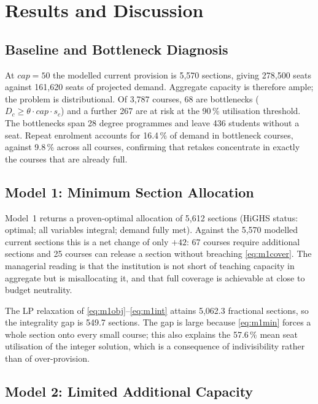 \documentclass[conference]{IEEEtran}
\begin{document}
\section{Results and Discussion}

\subsection{Baseline and Bottleneck Diagnosis}

At $cap = 50$ the modelled current provision is 5{,}570 sections, giving 278{,}500 seats
against 161{,}620 seats of projected demand. Aggregate capacity is therefore ample; the
problem is distributional. Of 3{,}787 courses, 68 are bottlenecks
($D_c \ge \theta \cdot cap \cdot s_c$) and a further 267 are at risk at the 90\,\%
utilisation threshold. The bottlenecks span 28 degree programmes and leave 436 students
without a seat. Repeat enrolment accounts for 16.4\,\% of demand in bottleneck courses,
against 9.8\,\% across all courses, confirming that retakes concentrate in exactly the
courses that are already full.

\subsection{Model 1: Minimum Section Allocation}

Model~1 returns a proven-optimal allocation of 5{,}612 sections (HiGHS status: optimal;
all variables integral; demand fully met). Against the 5{,}570 modelled current sections
this is a net change of only $+42$: 67 courses require additional sections and 25 courses
can release a section without breaching \eqref{eq:m1cover}. The managerial reading is
that the institution is not short of teaching capacity in aggregate but is misallocating
it, and that full coverage is achievable at close to budget neutrality.

The LP relaxation of \eqref{eq:m1obj}--\eqref{eq:m1int} attains 5{,}062.3 fractional
sections, so the integrality gap is 549.7 sections. The gap is large because
\eqref{eq:m1min} forces a whole section onto every small course; this also explains the
57.6\,\% mean seat utilisation of the integer solution, which is a consequence of
indivisibility rather than of over-provision.

\subsection{Model 2: Limited Additional Capacity}
\end{document}
